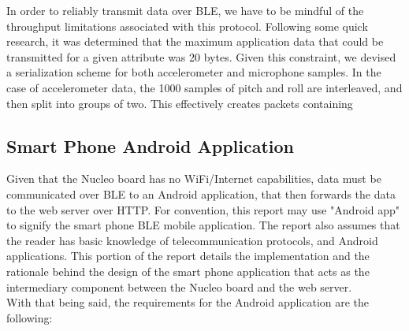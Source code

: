 In order to reliably transmit data over BLE, we have to be mindful of the throughput limitations associated with this protocol. Following some quick research, it was determined that the maximum application data that could be transmitted for a given attribute was 20 bytes\cite{blethroughput}. Given this constraint, we devised a serialization scheme for both accelerometer and microphone samples. In the case of accelerometer data, the 1000 samples of pitch and roll are interleaved, and then split into groups of two. This effectively creates packets containing
%
%
%
%
%
%
%


\subsection{Smart Phone Android Application}

Given that the Nucleo board has no WiFi/Internet capabilities, data must be communicated over BLE to an Android application, that then forwards the data to the web server over HTTP. For convention, this report may use "Android app" to signify the smart phone BLE mobile application. The report also assumes that the reader has basic knowledge of telecommunication protocols, and Android applications. This portion of the report details the implementation and the rationale behind the design of the smart phone application that acts as the intermediary component between the Nucleo board and the web server.\\
With that being said, the requirements for the Android application are the following:

